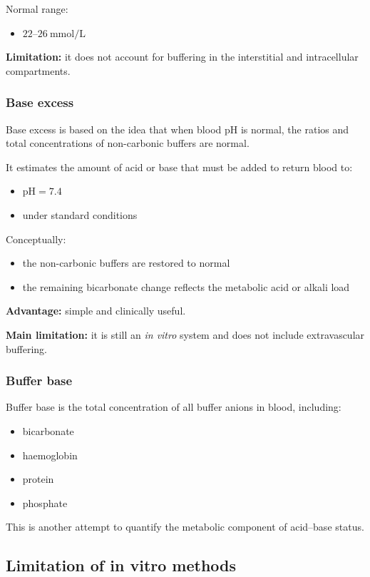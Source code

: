 \documentclass[11pt,a4paper]{article}
\begin{document}
Normal range:
\begin{itemize}
  \item \(22\text{--}26~\mathrm{mmol/L}\)
\end{itemize}

\textbf{Limitation:} it does not account for buffering in the interstitial and intracellular compartments.

\subsubsection{Base excess}
Base excess is based on the idea that when blood pH is normal, the ratios and total concentrations of non-carbonic buffers are normal.

It estimates the amount of acid or base that must be added to return blood to:
\begin{itemize}
  \item \(\mathrm{pH} = 7.4\)
  \item under standard conditions
\end{itemize}

Conceptually:
\begin{itemize}
  \item the non-carbonic buffers are restored to normal
  \item the remaining bicarbonate change reflects the metabolic acid or alkali load
\end{itemize}

\textbf{Advantage:} simple and clinically useful.

\textbf{Main limitation:} it is still an \emph{in vitro} system and does not include extravascular buffering.

\subsubsection{Buffer base}
Buffer base is the total concentration of all buffer anions in blood, including:
\begin{itemize}
  \item bicarbonate
  \item haemoglobin
  \item protein
  \item phosphate
\end{itemize}

This is another attempt to quantify the metabolic component of acid--base status.

\subsection{Limitation of in vitro methods}
\end{document}
